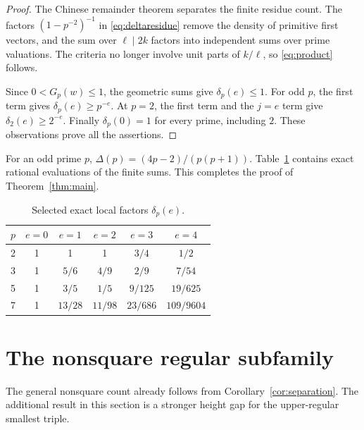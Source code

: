 \documentclass[11pt,a4paper]{article}
\numberwithin{equation}{section}
\theoremstyle{remark}
\begin{document}
\begin{proof}
The Chinese remainder theorem separates the finite residue count. The factors $(1-p^{-2})^{-1}$ in \eqref{eq:deltaresidue} remove the density of primitive first vectors, and the sum over $\ell\mid2k$ factors into independent sums over prime valuations. The criteria no longer involve unit parts of $k/\ell$, so \eqref{eq:product} follows.

Since $0<G_p(w)\le1$, the geometric sums give $\delta_p(e)\le1$. For odd $p$, the first term gives $\delta_p(e)\ge p^{-e}$. At $p=2$, the first term and the $j=e$ term give $\delta_2(e)\ge2^{-e}$. Finally $\delta_p(0)=1$ for every prime, including $2$. These observations prove all the assertions.
\end{proof}

For an odd prime $p$, $\Delta(p)=(4p-2)/(p(p+1))$. Table~\ref{tab:local} contains exact rational evaluations of the finite sums. This completes the proof of Theorem~\ref{thm:main}.
\begin{table}[ht]
\centering
\caption{Selected exact local factors $\delta_p(e)$.}\label{tab:local}
\begin{tabular}{c@{\qquad}ccccc}
\toprule
$p$&$e=0$&$e=1$&$e=2$&$e=3$&$e=4$\\\midrule
2&1&1&1&$3/4$&$1/2$\\
3&1&$5/6$&$4/9$&$2/9$&$7/54$\\
5&1&$3/5$&$1/5$&$9/125$&$19/625$\\
7&1&$13/28$&$11/98$&$23/686$&$109/9604$\\\bottomrule
\end{tabular}
\end{table}

\section{The nonsquare regular subfamily}\label{sec:nonsquare}
The general nonsquare count already follows from Corollary~\ref{cor:separation}. The additional result in this section is a stronger height gap for the upper-regular smallest triple.
\end{document}
